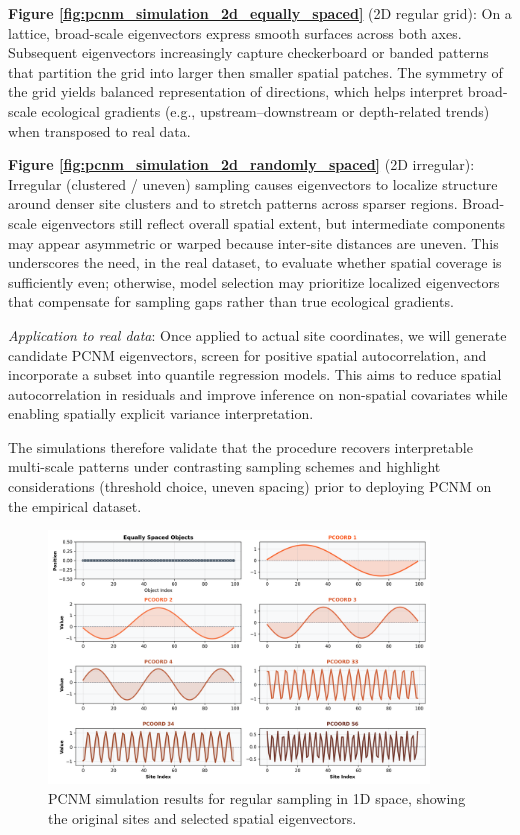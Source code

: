 \textbf{Figure \textcolor{blue}{\ref{fig:pcnm_simulation_2d_equally_spaced}}} (2D regular grid):
On a lattice, broad-scale eigenvectors express smooth surfaces across both axes. 
Subsequent eigenvectors increasingly capture checkerboard or banded patterns that 
partition the grid into larger then smaller spatial patches. 
The symmetry of the grid yields balanced representation of directions,
which helps interpret broad-scale ecological gradients (e.g., upstream--downstream or depth-related trends) when transposed to real data.

\textbf{Figure \textcolor{blue}{\ref{fig:pcnm_simulation_2d_randomly_spaced}}} (2D irregular): 
Irregular (clustered / uneven) sampling causes eigenvectors to localize structure around denser site clusters and to stretch patterns across sparser regions. Broad-scale eigenvectors still reflect overall spatial extent, but intermediate components may appear asymmetric or warped because inter-site distances are uneven. This underscores the need, in the real dataset, to evaluate whether spatial coverage is sufficiently even; otherwise, model selection may prioritize localized eigenvectors that compensate for sampling gaps rather than true ecological gradients.

\textit{Application to real data}: 
Once applied to actual site coordinates, we will generate candidate PCNM eigenvectors, 
screen for positive spatial autocorrelation, and incorporate a subset into quantile
regression models. This aims to reduce spatial autocorrelation in residuals and
improve inference on non-spatial covariates while enabling spatially explicit 
variance interpretation.

The simulations therefore validate that the procedure recovers interpretable multi-scale patterns under contrasting sampling schemes and highlight considerations (threshold choice, uneven spacing) prior to deploying PCNM on the empirical dataset.

\begin{figure}[!h]
\centering
\includegraphics[width=0.9\textwidth]{../results/preliminary_results/pcnm_simulation_1d_equally_spaced.png}
\caption{PCNM simulation results for regular sampling in 1D space, showing the original sites and selected spatial eigenvectors.}
\label{fig:pcnm_simulation_1d_equally_spaced}
\end{figure}

